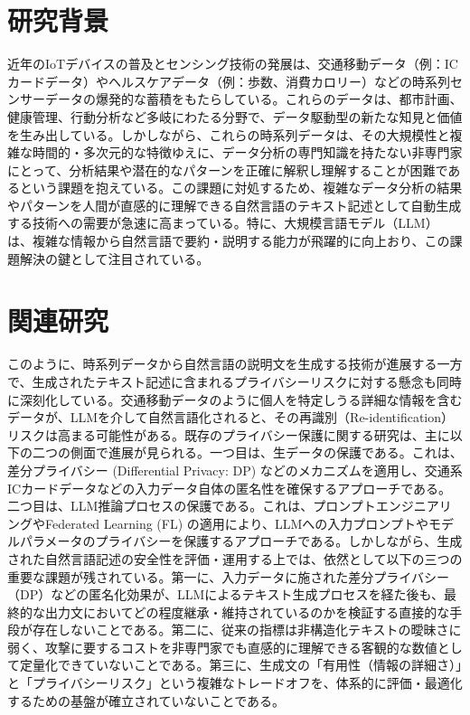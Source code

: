 \documentclass{my_bthesis}
\begin{document}
\section{研究背景}
近年のIoTデバイスの普及とセンシング技術の発展は、交通移動データ（例：ICカードデータ）やヘルスケアデータ（例：歩数、消費カロリー）などの時系列センサーデータの爆発的な蓄積をもたらしている。これらのデータは、都市計画、健康管理、行動分析など多岐にわたる分野で、データ駆動型の新たな知見と価値を生み出している。しかしながら、これらの時系列データは、その大規模性と複雑な時間的・多次元的な特徴ゆえに、データ分析の専門知識を持たない非専門家にとって、分析結果や潜在的なパターンを正確に解釈し理解することが困難であるという課題を抱えている。この課題に対処するため、複雑なデータ分析の結果やパターンを人間が直感的に理解できる自然言語のテキスト記述として自動生成する技術への需要が急速に高まっている。特に、大規模言語モデル（LLM）は、複雑な情報から自然言語で要約・説明する能力が飛躍的に向上おり、この課題解決の鍵として注目されている。\cite{10.1007/11787006_1}

\section{関連研究}
このように、時系列データから自然言語の説明文を生成する技術が進展する一方で、生成されたテキスト記述に含まれるプライバシーリスクに対する懸念も同時に深刻化している。交通移動データのように個人を特定しうる詳細な情報を含むデータが、LLMを介して自然言語化されると、その再識別（Re-identification）リスクは高まる可能性がある。既存のプライバシー保護に関する研究は、主に以下の二つの側面で進展が見られる。一つ目は、生データの保護である。これは、差分プライバシー (Differential Privacy: DP) などのメカニズムを適用し、交通系ICカードデータなどの入力データ自体の匿名性を確保するアプローチである。二つ目は、LLM推論プロセスの保護である。これは、プロンプトエンジニアリングやFederated Learning (FL) の適用により、LLMへの入力プロンプトやモデルパラメータのプライバシーを保護するアプローチである。しかしながら、生成された自然言語記述の安全性を評価・運用する上では、依然として以下の三つの重要な課題が残されている。第一に、入力データに施された差分プライバシー（DP）などの匿名化効果が、LLMによるテキスト生成プロセスを経た後も、最終的な出力文においてどの程度継承・維持されているのかを検証する直接的な手段が存在しないことである。第二に、従来の指標は非構造化テキストの曖昧さに弱く、攻撃に要するコストを非専門家でも直感的に理解できる客観的な数値として定量化できていないことである。第三に、生成文の「有用性（情報の詳細さ）」と「プライバシーリスク」という複雑なトレードオフを、体系的に評価・最適化するための基盤が確立されていないことである。
\end{document}
